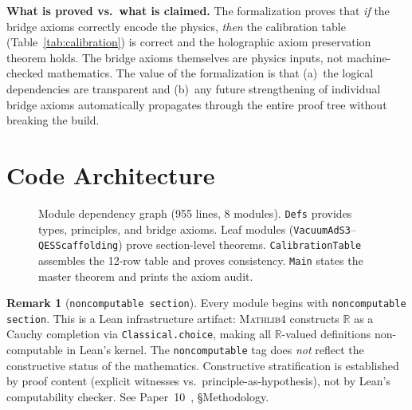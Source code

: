 \documentclass[11pt,a4paper]{article}
\theoremstyle{plain}
\theoremstyle{definition}
\newtheorem{remark}[theorem]{Remark}
\newcommand{\RR}{\mathbb{R}}
\newcommand{\Mathlib}{\textsc{Mathlib4}}
\begin{document}
\noindent\textbf{What is proved vs.\ what is claimed.}
The formalization proves that \emph{if} the bridge axioms
correctly encode the physics, \emph{then} the calibration table
(Table~\ref{tab:calibration}) is correct and the holographic
axiom preservation theorem holds.  The bridge axioms themselves
are physics inputs, not machine-checked mathematics.  The value
of the formalization is that (a)~the logical dependencies are
transparent and (b)~any future strengthening of individual
bridge axioms automatically propagates through the entire proof
tree without breaking the build.

\section{Code Architecture}\label{sec:arch}

\begin{figure}[ht]
\centering
{}
\caption{Module dependency graph (955 lines, 8 modules).
\texttt{Defs} provides types, principles, and bridge axioms.
Leaf modules (\texttt{VacuumAdS3}--\texttt{QESScaffolding}) prove
section-level theorems.  \texttt{CalibrationTable} assembles the
12-row table and proves consistency.  \texttt{Main} states the
master theorem and prints the axiom audit.}
\label{fig:arch}
\end{figure}

\begin{remark}[\texttt{noncomputable section}]\label{rem:noncomp}
Every module begins with \texttt{noncomputable section}.  This is a
Lean infrastructure artifact: \Mathlib{} constructs $\RR$ as a
Cauchy completion via \texttt{Classical.choice}, making all
$\RR$-valued definitions non-computable in Lean's kernel.
The \texttt{noncomputable} tag does \emph{not} reflect the
constructive status of the mathematics.
Constructive stratification is established by proof content
(explicit witnesses vs.\ principle-as-hypothesis), not by
Lean's computability checker.
See Paper~10~\cite{Lee26P10}, \S Methodology.
\end{remark}
\end{document}
